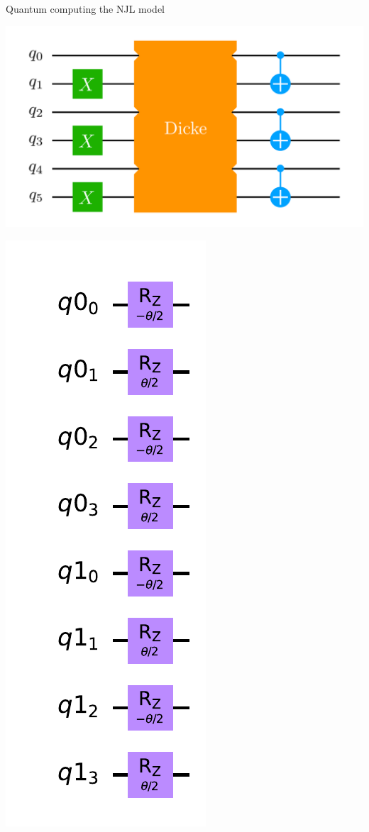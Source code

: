 \begin{frame}[allowframebreaks]{Quantum computing the NJL model}
\begin{minipage}[c]{\linewidth}
\begin{multicols}{2}
    \begin{center}
      \includegraphics[width=.25\paperwidth]{Figures/chapter06/hadron-init}
    \end{center}

    \vfill
    \columnbreak

    \begin{center}
      \includegraphics[width=.15\paperwidth]{Figures/chapter06/H4-rotation}
    \end{center}


\end{multicols}
\end{minipage}
\end{frame}
